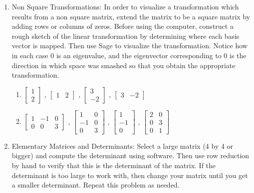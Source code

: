 \begin{enumerate}
\item Non Square Transformations:
In order to visualize a transformation which results from a non square matrix, extend the matrix to be a square matrix by adding rows or columns of zeros. Before using the computer, construct a rough sketch of the linear transformation by determining where each basis vector is mapped. Then use Sage to visualize the transformation.  Notice how in each case 0 is an eigenvalue, and the eigenvector corresponding to 0 is the direction in which space was smashed so that you obtain the appropriate transformation.
\begin{enumerate}
\item 
	$\begin{bmatrix}
	1 \\
	2 
	\end{bmatrix}$
,	$\begin{bmatrix}
	1 &2 
	\end{bmatrix}$
,  $\begin{bmatrix}
	3 \\
	-2
	\end{bmatrix}$
,	$\begin{bmatrix}
	3 &-2 
	\end{bmatrix}$
\item
	$\begin{bmatrix}
	1 &-1 &0\\
	0 &0 &3
	\end{bmatrix}$
,	$\begin{bmatrix}
	1 &0 \\
	-1 &0 \\
	0 &3
	\end{bmatrix}$
,	$\begin{bmatrix}
	1\\	-1 \\0
	\end{bmatrix}$
,	$\begin{bmatrix}
	2 &0 \\
	0 &3 \\
	0 &1 
	\end{bmatrix}$
\end{enumerate}

\item Elementary Matrices and Determinants:
Select a large matrix (4 by 4 or bigger) and compute the determinant using software. 
Then use row reduction by hand to verify that this is the determinant of the matrix. 
If the determinant is too large to work with, then change your matrix until you get a smaller determinant.  
Repeat this problem as needed.

\end{enumerate}


